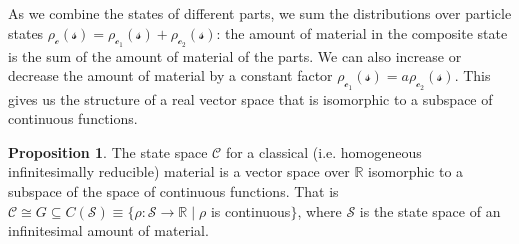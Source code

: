 \documentclass[smallextended]{svjour3}
\numberwithin{equation}{section}
\theoremstyle{definition}
\newtheorem{prop}[equation]{Proposition}
\begin{document}
As we combine the states of different parts, we sum the distributions over particle states $\rho_{\mathcal{c}}(\mathcal{s})=\rho_{\mathcal{c}_1}(\mathcal{s})+\rho_{\mathcal{c}_2}(\mathcal{s})$: the amount of material in the composite state is the sum of the amount of material of the parts. We can also increase or decrease the amount of material by a constant factor $\rho_{\mathcal{c}_1}(\mathcal{s})=a\rho_{\mathcal{c}_2}(\mathcal{s})$. This gives us the structure of a real vector space that is isomorphic to a subspace of continuous functions.

\begin{prop}\label{prop:real_vector_space}
The state space $\mathcal{C}$ for a classical (i.e. homogeneous infinitesimally reducible) material is a vector space over $\mathbb{R}$ isomorphic to a subspace of the space of continuous functions. That is $\mathcal{C} \cong G \subseteq C(\mathcal{S}) \equiv \{\rho:\mathcal{S} \rightarrow \mathbb{R} \; | \; \rho$ is continuous$\}$, where $\mathcal{S}$ is the state space of an infinitesimal amount of material.
\end{prop}
\end{document}
